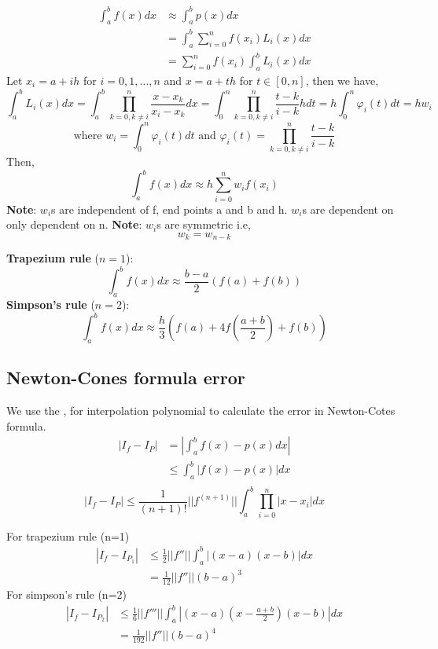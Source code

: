 \documentclass{article}
\begin{document}
		\begin{align*}
			\int_a^b f(x) dx &\approx \int_a^b p(x) dx\\
							 &= \int_a^b \sum_{i=0}^n f(x_i) L_i(x) dx\\
							 &= \sum_{i=0}^n f(x_i) \int_a^b L_i(x) dx
		\end{align*}
		Let $x_i = a+ih$ for $i=0,1,\hdots,n$ and $x= a + th$ for $t\in [0,n]$, then  we have,
		\[\int_a^b L_i(x) dx= \int_a^b \prod_{k=0, k\neq i}^n \frac{x-x_k}{x_i-x_k} dx = \int_0^n  \prod_{k=0, k\neq i}^n \frac{t-k}{i-k} h dt = h\int_0^n \varphi_i(t) dt = h w_i\]
		\[\text{where }w_i = \int_0^n \varphi_i(t) dt\text{    and   }\varphi_i(t) = \prod_{k=0, k\neq i}^n \frac{t-k}{i-k}\]
		\noindent Then,
		\[\boxed{\int_a^b f(x)dx \approx h \sum_{i=0}^n w_i f(x_i)} \]
		\textbf{Note}: $w_i$s are independent of f, end points a and b and h. $w_i$s are dependent on only dependent on n.
		\textbf{Note}: $w_i$s are symmetric i.e, 
		\[w_k = w_{n-k}\]

		\noindent \textbf{Trapezium rule} ($n=1$):
			\[\int_a^b f(x)dx \approx \frac{b-a}{2} (f(a)+f(b))\]
		\textbf{Simpson's rule} ($n=2$):
			\[\int_a^b f(x)dx \approx \frac{h}{3} \left(f(a) + 4f\left(\frac{a+b}{2}\right)+ f(b)\right)\]


	\subsection{Newton-Cones formula error}
	We use the , for interpolation polynomial to calculate the error in Newton-Cotes formula.
		\begin{align*}
			|I_f - I_P|  &= \left|\int_a^b f(x)-p(x) dx \right|\\
						 &\leq \int_a^b |f(x)-p(x)|dx\\
			\end{align*}
		 \[\boxed{|I_f - I_P|  \leq \frac{1}{(n+1)!} ||f^{(n+1)}|| \int_a^b \prod_{i=0}^n |x-x_i| dx}\]

		For trapezium rule (n=1)
		\begin{align*}
		|I_f - I_{P_1}|  &\leq \frac{1}{2} ||f''|| \int_a^b |(x-a)(x-b)|dx\\
							&= \frac{1}{12} ||f''||{(b-a)^3}
		\end{align*}
		For simpson's rule (n=2)
		\begin{align*}
		|I_f - I_{P_2}|  &\leq \frac{1}{6} ||f'''|| \int_a^b |(x-a)(x-\frac{a+b}{2})(x-b)|dx\\
							&= \frac{1}{192} ||f''||{(b-a)^4}
		\end{align*}
\end{document}
